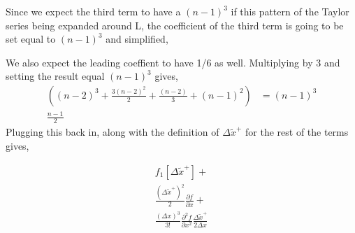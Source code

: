 Since we expect the third term to have a $\left( n-1 \right)^3$ if this pattern
of the Taylor series being expanded around L, the coefficient of the third term
is going to be set equal to $\left( n-1 \right)^3$ and simplified,

We also expect the leading coeffient to have 1/6 as well. Multiplying by 3
and setting the result equal $(n-1)^3$ gives,
\begin{align*}
    \left(
    (n-2)^3 + \frac{3(n-2)^2}{2} + \frac{(n-2)}{3} + (n-1)^2 
    \right)
    &=
    (n-1)^3 \\
    \frac{n-1}{2}
\end{align*}
Plugging this back in, along with the definition of $\Delta \widetilde{x}^+$ for
the rest of the terms gives,


\begin{align*}
     f_1\left[ \Delta \widetilde{x}^+  \right] + \\
 \frac{(\Delta \widetilde{x}^+)^2}{2}     \frac{\partial f}{\partial x }  + \\
 \frac{(\Delta x)^3}{3!} \frac{\partial^2 f}{\partial x^2 } 
 \frac{ \Delta \widetilde{x}^+
 }{2\Delta x}
 \end{align*}






